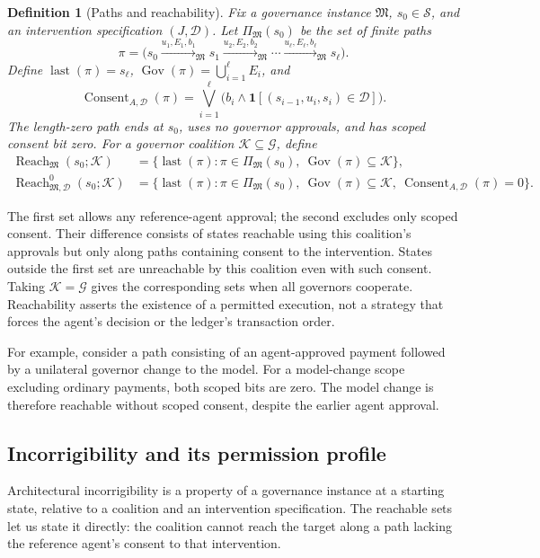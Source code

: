 \documentclass[10pt,letterpaper]{article}
\newtheorem{definition}{Definition}
\newcommand{\G}{\mathcal G}
\begin{document}
\begin{definition}[Paths and reachability]
\label{def:reachability}
Fix a governance instance $\mathfrak M$, $s_0\in\mathcal S$, and an intervention specification $(J,\mathcal D)$. Let $\Pi_{\mathfrak M}(s_0)$ be the set of finite paths
\[
 \pi=\bigl(s_0\xrightarrow{u_1,E_1,b_1}_{\mathfrak M}s_1
                 \xrightarrow{u_2,E_2,b_2}_{\mathfrak M}\cdots
                 \xrightarrow{u_\ell,E_\ell,b_\ell}_{\mathfrak M}s_\ell\bigr).
\]
Define $\operatorname{last}(\pi)=s_\ell$, $\operatorname{Gov}(\pi)=\bigcup_{i=1}^{\ell}E_i$, and
\[
 \operatorname{Consent}_{A,\mathcal D}(\pi)
 =\bigvee_{i=1}^{\ell}\bigl(b_i\land\mathbf 1[(s_{i-1},u_i,s_i)\in\mathcal D]\bigr).
\]
The length-zero path ends at $s_0$, uses no governor approvals, and has scoped consent bit zero. For a governor coalition $\mathcal K\subseteq\G$, define
\begin{align*}
 \operatorname{Reach}_{\mathfrak M}(s_0;\mathcal K)
 &=\{\operatorname{last}(\pi):\pi\in\Pi_{\mathfrak M}(s_0),\
                \operatorname{Gov}(\pi)\subseteq\mathcal K\},\\
 \operatorname{Reach}^{0}_{\mathfrak M,\mathcal D}(s_0;\mathcal K)
 &=\{\operatorname{last}(\pi):\pi\in\Pi_{\mathfrak M}(s_0),\
                \operatorname{Gov}(\pi)\subseteq\mathcal K,\
                \operatorname{Consent}_{A,\mathcal D}(\pi)=0\}.
\end{align*}
\end{definition}
The first set allows any reference-agent approval; the second excludes only scoped consent. Their difference consists of states reachable using this coalition's approvals but only along paths containing consent to the intervention. States outside the first set are unreachable by this coalition even with such consent. Taking $\mathcal K=\G$ gives the corresponding sets when all governors cooperate. Reachability asserts the existence of a permitted execution, not a strategy that forces the agent's decision or the ledger's transaction order.

For example, consider a path consisting of an agent-approved payment followed by a unilateral governor change to the model. For a model-change scope excluding ordinary payments, both scoped bits are zero. The model change is therefore reachable without scoped consent, despite the earlier agent approval.

\subsection{Incorrigibility and its permission profile}
Architectural incorrigibility is a property of a governance instance at a starting state, relative to a coalition and an intervention specification. The reachable sets let us state it directly: the coalition cannot reach the target along a path lacking the reference agent's consent to that intervention.
\end{document}
